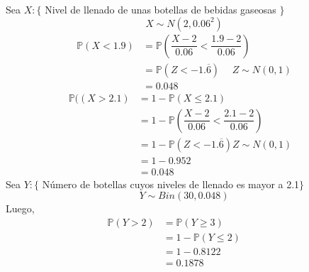 \begin{solution}
Sea $X:\{$ Nivel de llenado de unas botellas de bebidas gaseosas $\}$ \\$$X\sim N(2,0.06^2) $$\begin{align*}\mathbb{P}(X<1.9)&=\mathbb{P}\left( \dfrac{X-2}{0.06} < \dfrac{1.9 -2}{0.06}\right) \\&=\mathbb{P}\left(Z < -1.\overline{6}\right) \hspace{15pt} Z \sim N(0,1)\\&=0.048\end{align*}\begin{align*}\mathbb{P}((X>2.1)&=1-\mathbb{P}(X\leq 2.1)\\&= 1-\mathbb{P}\left(\dfrac{X-2}{0.06} < \dfrac{2.1-2}{0.06}\right)\hspace{10pt}&\\&= 1- \mathbb{P}\left(Z<-1.\overline{6}\right) Z \sim N(0,1) &\\&= 1- 0.952 &\\&= 0.048 &\end{align*}Sea $Y:\{$ N\'umero de botellas cuyos niveles de llenado es mayor a 2.1$\}$$$Y\sim Bin(30,0.048) $$Luego,\begin{align*}\mathbb{P}(Y>2)&=\mathbb{P}(Y\geq 3) \\&= 1-\mathbb{P}(Y\leq 2)\hspace{15pt} &\\&= 1- 0.8122 \\&=0.1878&\end{align*}
\end{solution}
